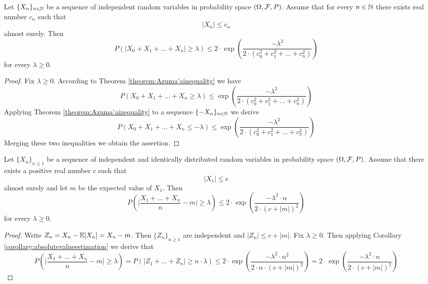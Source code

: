 \begin{corollary}\label{corollary:absolutevalueestimation}
Let $\{X_n\}_{n\in {\mathbb N}}$ be a sequence of independent random variables in probability space $\left(\Omega, {\mathcal F},P\right)$. Assume that for every $n\in {\mathbb N}$ there exists real number $c_n$ such that 
$$|X_n|\leq c_n$$
almost surely. Then 
$$P\left(|X_0+X_1+...+X_n|\geq \lambda\right)\leq 2\cdot \exp\left(\frac{-\lambda^2}{2\cdot \left(c_0^2+c_1^2+...+c^2_n\right)}\right)$$
for every $\lambda \geq 0$.
\end{corollary}
\begin{proof}
Fix $\lambda \geq 0$. According to Theorem \ref{theorem:Azuma'ainequality} we have
$$P\left(X_0+X_1+...+X_n\geq \lambda\right)\leq \exp\left(\frac{-\lambda^2}{2\cdot \left(c_0^2+c_1^2+...+c^2_n\right)}\right)$$
Applying Theorem \ref{theorem:Azuma'ainequality} to a sequence $\{-X_n\}_{n\in {\mathbb N}}$ we derive
$$P\left(X_0+X_1+...+X_n\leq -\lambda\right)\leq \exp\left(\frac{-\lambda^2}{2\cdot \left(c_0^2+c_1^2+...+c^2_n\right)}\right)$$
Merging these two inequalities we obtain the assertion.
\end{proof}

\begin{corollary}\label{corollary:Hoeffdinginequality}
Let $\{X_n\}_{n\geq 1}$ be a sequence of independent and identically distributed random variables in probability space $\left(\Omega, {\mathcal F},P\right)$. Assume that there exists a positive real number $c$ such that 
$$|X_1|\leq c$$
almost surely and let $m$ be the expected value of $X_1$. Then 
$$P\left(\bigg|\frac{X_1+...+X_n}{n}-m\bigg|\geq \lambda\right)\leq 2\cdot \exp\left(\frac{-\lambda^2\cdot n}{2\cdot (c+|m|)^2}\right)$$
for every $\lambda \geq 0$.
\end{corollary}
\begin{proof}
Write $Z_n = X_n - {\mathbb E} [X_n]= X_n -m$. Then $\{Z_n\}_{n\geq 1}$ are independent and $|Z_n|\leq c+|m|$. Fix $\lambda \geq 0$. Then applying Corollary \ref{corollary:absolutevalueestimation} we derive that
$$P\left(\bigg|\frac{X_1+...+X_n}{n}-m\bigg|\geq \lambda\right)= P\left(|Z_1+...+Z_n|\geq n\cdot \lambda\right)\leq 2\cdot \exp\left(\frac{-\lambda^2\cdot n^2}{2\cdot n\cdot (c+|m|)^2}\right)=2\cdot \exp\left(\frac{-\lambda^2\cdot n}{2\cdot (c+|m|)^2}\right)$$
\end{proof}


